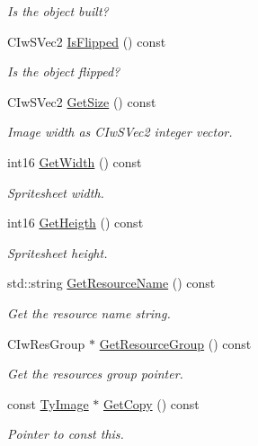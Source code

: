 \begin{DoxyCompactItemize}
\begin{DoxyCompactList}\small\item\em Is the object built? \end{DoxyCompactList}\item 
CIwSVec2 \hyperlink{class_ty_image_ab09c2f7b0f02f515fae45d5a058e3284}{IsFlipped} () const 
\begin{DoxyCompactList}\small\item\em Is the object flipped? \end{DoxyCompactList}\item 
CIwSVec2 \hyperlink{class_ty_image_adc2770783bb985d944247270468d7c21}{GetSize} () const 
\begin{DoxyCompactList}\small\item\em Image width as CIwSVec2 integer vector. \end{DoxyCompactList}\item 
int16 \hyperlink{class_ty_image_afb46a63dca96bcdb26aa0610aacaaa66}{GetWidth} () const 
\begin{DoxyCompactList}\small\item\em Spritesheet width. \end{DoxyCompactList}\item 
int16 \hyperlink{class_ty_image_a8b88cce6ca9d65532ad4c60fc8e651a4}{GetHeigth} () const 
\begin{DoxyCompactList}\small\item\em Spritesheet height. \end{DoxyCompactList}\item 
std::string \hyperlink{class_ty_image_af630b3defe704e239378120e68dbbb70}{GetResourceName} () const 
\begin{DoxyCompactList}\small\item\em Get the resource name string. \end{DoxyCompactList}\item 
CIwResGroup $\ast$ \hyperlink{class_ty_image_a706a3787b40ec13b5c61035a3bfdd016}{GetResourceGroup} () const 
\begin{DoxyCompactList}\small\item\em Get the resources group pointer. \end{DoxyCompactList}\item 
const \hyperlink{class_ty_image}{TyImage} $\ast$ \hyperlink{class_ty_image_a48acb344f18ab58e7603876366f5fc58}{GetCopy} () const 
\begin{DoxyCompactList}\small\item\em Pointer to const this. \end{DoxyCompactList}\item 

\end{DoxyCompactItemize}
